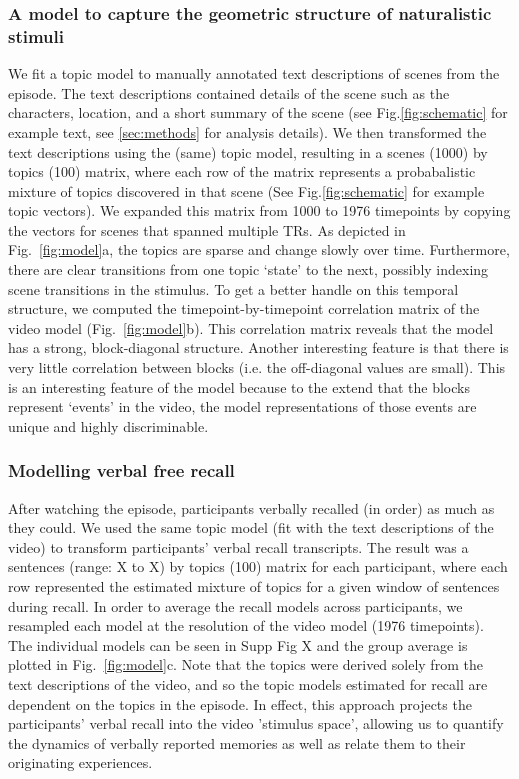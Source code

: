 \documentclass{article}
\begin{document}
{\subsubsection{A model to capture the geometric structure of naturalistic stimuli}
We fit a topic model \citep{BleiEtal03} to manually annotated text descriptions of scenes from the episode. The text descriptions contained details of the scene such as the characters, location, and a short summary of the scene (see Fig.\ref{fig:schematic} for example text, see \ref{sec:methods} for analysis details). We then transformed the text descriptions using the (same) topic model, resulting in a scenes (1000) by topics (100) matrix, where each row of the matrix represents a probabalistic mixture of topics discovered in that scene (See Fig.\ref{fig:schematic} for example topic vectors). We expanded this matrix from 1000 to 1976 timepoints by copying the vectors for scenes that spanned multiple TRs. As depicted in Fig.~\ref{fig:model}a, the topics are sparse and change slowly over time. Furthermore, there are clear transitions from one topic `state' to the next, possibly indexing scene transitions in the stimulus.  To get a better handle on this temporal structure, we computed the timepoint-by-timepoint correlation matrix of the video model (Fig.~\ref{fig:model}b).  This correlation matrix reveals that the model has a strong, block-diagonal structure. Another interesting feature is that there is very little correlation between blocks (i.e. the off-diagonal values are small). This is an interesting feature of the model because to the extend that the blocks represent `events' in the video, the model representations of those events are unique and highly discriminable.

\subsubsection{Modelling verbal free recall}
After watching the episode, participants verbally recalled (in order) as much as they could.  We used the same topic model (fit with the text descriptions of the video) to transform participants' verbal recall transcripts. The result was a sentences (range: X to X) by topics (100) matrix for each participant, where each row represented the estimated mixture of topics for a given window of sentences during recall. In order to average the recall models across participants, we resampled each model at the resolution of the video model (1976 timepoints). The individual models can be seen in Supp Fig X and the group average is plotted in Fig.~\ref{fig:model}c. Note that the topics were derived solely from the text descriptions of the video, and so the topic models estimated for recall are dependent on the topics in the episode. In effect, this approach projects the participants' verbal recall into the video 'stimulus space', allowing us to quantify the dynamics of verbally reported memories as well as relate them to their originating experiences.

}
\end{document}
